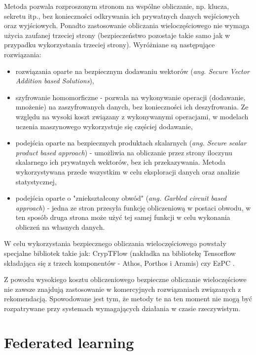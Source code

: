 Metoda pozwala rozproszonym stronom na wspólne obliczanie, np. klucza, sekretu itp., bez konieczności odkrywania ich prywatnych danych wejściowych oraz wyjściowych. Ponadto zastosowanie obliczania wieloczęściowego nie wymaga użycia zaufanej trzeciej strony (bezpieczeństwo pozostaje takie samo jak w przypadku wykorzystania trzeciej strony). 
Wyróżniane są następujące rozwiązania:
\begin{itemize}
    \item rozwiązania oparte na bezpiecznym dodawaniu wektorów (\textit{ang. Secure Vector Addition based Solutions}),
    \item szyfrowanie homomorficzne - pozwala na wykonywanie operacji (dodawanie, mnożenie) na zaszyfrowanych danych, bez konieczności ich deszyfrowania. Ze względu na wysoki koszt związany z wykonywanymi operacjami, w modelach uczenia maszynowego wykorzystuje się częściej dodawanie,
    \item podejścia oparte na bezpiecznych produktach skalarnych (\textit{ang. Secure scalar product based approach}) - umożliwia na obliczanie przez strony iloczynu skalarnego ich prywatnych wektorów, bez ich przekazywania. Metoda wykorzystywana przede wszystkim w celu eksploracji danych oraz analizie statystycznej,
    \item podejścia oparte o "zniekształcony obwód" (\textit{ang. Garbled circuit based approach}) - jedna ze stron przesyła funkcję obliczeniową w postaci obwodu, w ten sposób druga strona może użyć tej samej funkcji w celu wykonania obliczeń na własnych danych.
\end{itemize}

W celu wykorzystania bezpiecznego obliczania wieloczęściowego powstały specjalne bibliotek takie jak: CrypTFlow (nakładka na bibliotekę Tensorflow składająca się z trzech komponentów - Athos, Porthos i Aramis) \cite{kumar2020cryptflow} czy EzPC \cite{chandran2019ezpc}.

Z powodu wysokiego kosztu obliczeniowego bezpieczne obliczanie wieloczęściowe nie zawsze znajdują zastosowanie w komercyjnych rozwiązaniach związanych z rekomendacją. Spowodowane jest tym, że metody te na ten moment nie mogą być rozpatrywane przy systemach wymagających działania w czasie rzeczywistym. \cite{secureMultipartyComputation}

\section{Federated learning}
\label{section:federatedLearning}

